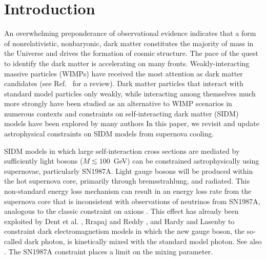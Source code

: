 \documentclass[nofootinbib,prd,superscriptaddress,twocolumn]{revtex4}
\begin{document}
\section{Introduction}

An overwhelming preponderance of observational evidence indicates that a form of nonrelativistic, nonbaryonic, 
dark matter constitutes the majority of mass in the Universe and drives the formation of cosmic structure. 
The pace of the quest to identify the dark matter is accelerating on many fronts. Weakly-interacting massive 
particles (WIMPs) have received the most attention as dark matter candidates (see Ref.~\cite{jungman_etal96} for a review). 
Dark matter particles that interact with standard model particles only weakly, while interacting among themselves 
much more strongly have been studied as an alternative to WIMP scenarios in numerous contexts 
\cite{carlson_etal92,deLaix_etal95,atrio-barandela_davidson97,spergel_steinhardt00,hogan_dalcanton00,mohapatra_teplitz00,
dave_etal01,hisano_etal04,hisano_etal05,pospelov_etal08,arkani-hamed_etal08a,lattanzi_silk08,ackerman_etal09,feng_etal09,
kong_etal15,Buckley:2009in,Boddy:2014yra,Boddy:2014qxa,Boddy:2016bbu}
and constraints on self-interacting dark matter (SIDM) models have been explored by many authors \cite{yoshida_etal00,gnedin_ostriker01,miralda-escude02,randall_etal08,kamionkowski_profumo08,zentner09,robertson_zentner09,pieri_etal09,spolyar_etal09,finkbeiner_etal09,slatyer_etal09,bramante_etal14,albuquerque_etal14,kaplinghat_etal14,chen_etal14,feng_etal16,catena_widmark16,Markevitch:2003at,Zavala:2012us,Rocha:2012jg,Peter:2012jh,Kahlhoefer:2013dca,Elbert:2014bma,Feng:2015hja,DelNobile:2015uua,Feng:2016ijc,Dooley:2016ajo,Kim:2016ujt,Bringmann:2016din} 
In this paper, we revisit and update astrophysical constraints on SIDM models from supernova cooling.


SIDM models in which large self-interaction cross sections are mediated by sufficiently light 
bosons ($M \lesssim 100$~GeV) can be constrained astrophysically using supernovae, particularly 
SN1987A. Light gauge bosons will be produced within the hot supernova core, primarily through 
bremsstrahlung, and radiated. This non-standard energy loss mechanism can result in an energy loss rate 
from the supernova core that is inconsistent with observations of neutrinos from SN1987A, 
analogous to the classic constraint on axions \cite{turner88,raffelt96_book}. 
This effect has already been exploited by Dent et al. \cite{dent_etal12}, Rrapaj and Reddy \cite{rrapaj_reddy16}, and 
Hardy and Lasenby \cite{hardy_lasenby17} 
to constraint dark electromagnetism models in which the new gauge boson, the so-called dark photon, 
is kinetically mixed with the standard model photon. See also \cite{Kazanas:2014mca,Zhang:2014wra,Chang:2016ntp}. The SN1987A constraint places a limit on the mixing parameter. 
\end{document}
